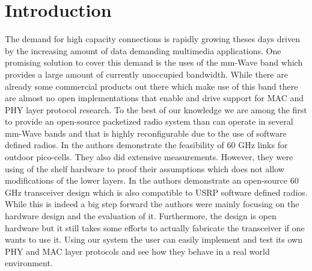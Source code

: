 \documentclass{acm_proc_article-sp}
\begin{document}



\section{Introduction}
The demand for high capacity connections is rapidly growing theses days driven by the increasing amount of data demanding multimedia applications. 
One promising solution to cover this demand is the uses of the mm-Wave band which provides a large amount of currently unoccupied bandwidth. 
While there are already some commercial products out there which make use of this band \cite{vubiqnetworks} \cite{hxi} there are almost no open implementations that enable and drive support for MAC and PHY layer protocol research.
To the best of our knowledge we are among the first to provide an open-source packetized radio system than can operate in several mm-Wave bands and that is highly reconfigurable due to the use of software defined radios.
In \cite{Zhu14} the authors demonstrate the feasibility of 60 GHz links for outdoor pico-cells. They also did extensive measurements. However, they were using of the shelf hardware to proof their assumptions which does not allow modifications of the lower layers.
In \cite{Zetterberg15} the authors demonstrate an open-source 60 GHz transceiver design which is also compatible to USRP software defined radios. While this is indeed a big step forward the authors were mainly focusing on the hardware design and the evaluation of it. Furthermore, the design is open hardware but it still takes some efforts to actually fabricate the transceiver if one wants to use it.
Using our system the user can easily implement and test its own PHY and MAC layer protocols and see how they behave in a real world environment.
\end{document}
